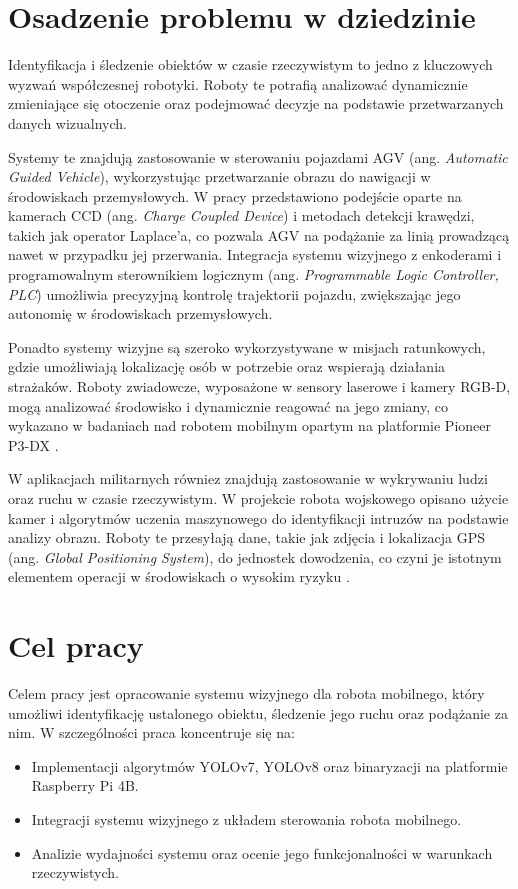 \documentclass[a4paper,twoside,12pt]{book}
\begin{document}
\newpage
\section{Osadzenie problemu w dziedzinie}

Identyfikacja i śledzenie obiektów w czasie rzeczywistym to jedno z kluczowych wyzwań współczesnej robotyki. Roboty te potrafią analizować dynamicznie zmieniające się otoczenie oraz podejmować decyzje na podstawie przetwarzanych danych wizualnych.

Systemy te znajdują zastosowanie w sterowaniu pojazdami AGV (ang. \textit{Automatic Guided Vehicle}), wykorzystując przetwarzanie obrazu do nawigacji w środowiskach przemysłowych. W pracy \cite{bib:butdee2009automatic} przedstawiono podejście oparte na kamerach CCD (ang. \textit{Charge Coupled Device}) i metodach detekcji krawędzi, takich jak operator Laplace’a, co pozwala AGV na podążanie za linią prowadzącą nawet w przypadku jej przerwania. Integracja systemu wizyjnego z enkoderami i programowalnym sterownikiem logicznym (ang. \textit{Programmable Logic Controller, PLC}) umożliwia precyzyjną kontrolę trajektorii pojazdu, zwiększając jego autonomię w środowiskach przemysłowych.

Ponadto systemy wizyjne są szeroko wykorzystywane w misjach ratunkowych, gdzie umożliwiają lokalizację osób w potrzebie oraz wspierają działania strażaków. Roboty zwiadowcze, wyposażone w sensory laserowe i kamery RGB-D, mogą analizować środowisko i dynamicznie reagować na jego zmiany, co wykazano w badaniach nad robotem mobilnym opartym na platformie Pioneer P3-DX \cite{bib:liu2019autonomous}.

W aplikacjach militarnych równiez znajdują zastosowanie w wykrywaniu ludzi oraz ruchu w czasie rzeczywistym. W projekcie robota wojskowego opisano użycie kamer i algorytmów uczenia maszynowego do identyfikacji intruzów na podstawie analizy obrazu. Roboty te przesyłają dane, takie jak zdjęcia i lokalizacja GPS (ang. \textit{Global Positioning System}), do jednostek dowodzenia, co czyni je istotnym elementem operacji w środowiskach o wysokim ryzyku \cite{bib:usha2017military}.

\section{Cel pracy}
Celem pracy jest opracowanie systemu wizyjnego dla robota mobilnego, który umożliwi identyfikację ustalonego obiektu, śledzenie jego ruchu oraz podążanie za nim. W szczególności praca koncentruje się na:
\begin{itemize}
    \item Implementacji algorytmów YOLOv7, YOLOv8 oraz binaryzacji na platformie Raspberry Pi 4B.
    \item Integracji systemu wizyjnego z układem sterowania robota mobilnego.
    \item Analizie wydajności systemu oraz ocenie jego funkcjonalności w warunkach rzeczywistych.
\end{itemize}
\end{document}
